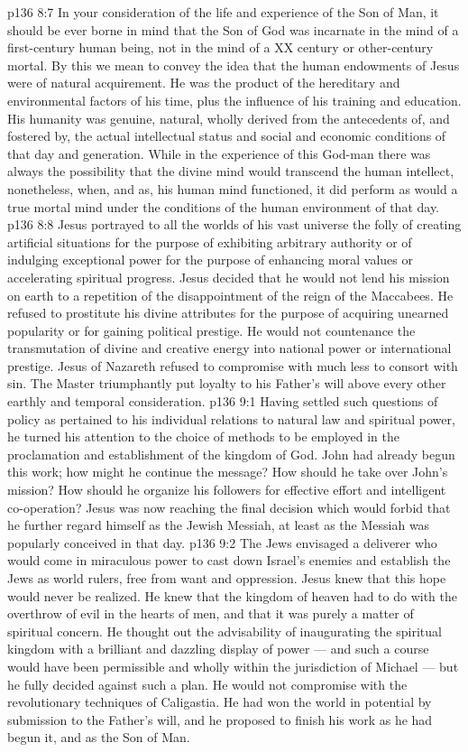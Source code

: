 \vs p136 8:7 \pc In your consideration of the life and experience of the Son of Man, it should be ever borne in mind that the Son of God was incarnate in the mind of a first\hyp{}century human being, not in the mind of a XX century or other\hyp{}century mortal. By this we mean to convey the idea that the human endowments of Jesus were of natural acquirement. He was the product of the hereditary and environmental factors of his time, plus the influence of his training and education. His humanity was genuine, natural, wholly derived from the antecedents of, and fostered by, the actual intellectual status and social and economic conditions of that day and generation. While in the experience of this God\hyp{}man there was always the possibility that the divine mind would transcend the human intellect, nonetheless, when, and as, his human mind functioned, it did perform as would a true mortal mind under the conditions of the human environment of that day.
\vs p136 8:8 \pc Jesus portrayed to all the worlds of his vast universe the folly of creating artificial situations for the purpose of exhibiting arbitrary authority or of indulging exceptional power for the purpose of enhancing moral values or accelerating spiritual progress. Jesus decided that he would not lend his mission on earth to a repetition of the disappointment of the reign of the Maccabees. He refused to prostitute his divine attributes for the purpose of acquiring unearned popularity or for gaining political prestige. He would not countenance the transmutation of divine and creative energy into national power or international prestige. Jesus of Nazareth refused to compromise with  much less to consort with sin. The Master triumphantly put loyalty to his Father’s will above every other earthly and temporal consideration.
\vs p136 9:1 Having settled such questions of policy as pertained to his individual relations to natural law and spiritual power, he turned his attention to the choice of methods to be employed in the proclamation and establishment of the kingdom of God. John had already begun this work; how might he continue the message? How should he take over John’s mission? How should he organize his followers for effective effort and intelligent co\hyp{}operation? Jesus was now reaching the final decision which would forbid that he further regard himself as the Jewish Messiah, at least as the Messiah was popularly conceived in that day.
\vs p136 9:2 The Jews envisaged a deliverer who would come in miraculous power to cast down Israel’s enemies and establish the Jews as world rulers, free from want and oppression. Jesus knew that this hope would never be realized. He knew that the kingdom of heaven had to do with the overthrow of evil in the hearts of men, and that it was purely a matter of spiritual concern. He thought out the advisability of inaugurating the spiritual kingdom with a brilliant and dazzling display of power --- and such a course would have been permissible and wholly within the jurisdiction of Michael --- but he fully decided against such a plan. He would not compromise with the revolutionary techniques of Caligastia. He had won the world in potential by submission to the Father’s will, and he proposed to finish his work as he had begun it, and as the Son of Man.
